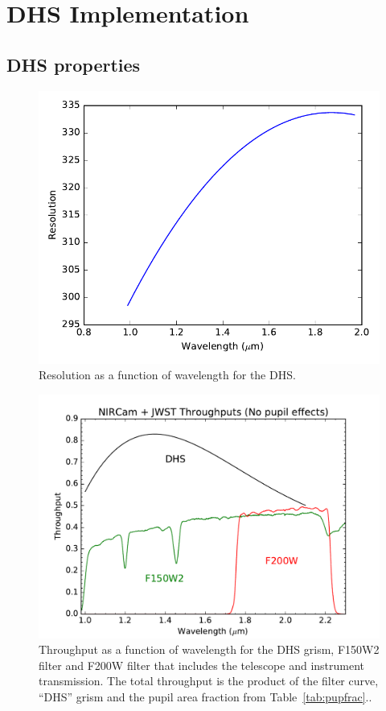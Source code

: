 \documentclass[iop]{emulateapj}
\begin{document}
\section{DHS Implementation}\label{sec:implementation}

\subsection{DHS properties}

\begin{figure}
\centering
\includegraphics[width=1.0\columnwidth]{dhs_res.pdf}
\caption{Resolution as a function of wavelength for the DHS.}\label{fig:DHSRes}
\end{figure}

\begin{figure}
\centering
\includegraphics[width=1.0\columnwidth]{NIRCam+OTE_SWA_DHS_and_F150W2_efficiency.pdf}
\caption{Throughput as a function of wavelength for the DHS grism, F150W2 filter and F200W filter that includes the telescope and instrument transmission. The total throughput is the product of the filter curve, ``DHS'' grism and the pupil area fraction from Table~\ref{tab:pupfrac}..}\label{fig:DHSthrough}
\end{figure}
\end{document}
